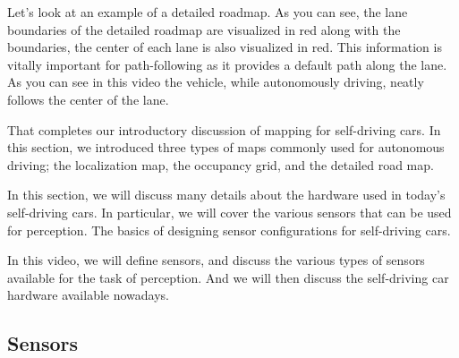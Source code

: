 Let's look at an example of a detailed roadmap. As you can see, the lane boundaries of
the detailed roadmap are visualized in red along with the boundaries, the center
of each lane is also visualized in red. This information is vitally important for path-following as it provides
a default path along the lane. As you can see in this video the vehicle, while autonomously driving,
neatly follows the center of the lane. 



That completes our introductory discussion of
mapping for self-driving cars. In this section, we introduced  three
types of maps commonly used for autonomous driving; the localization map, the
occupancy grid, and the detailed road map. 





















































In this section, we will  discuss many details about the hardware used in
today's self-driving cars. In particular, we will cover the various
sensors that can be used for perception. The basics of designing sensor
configurations for self-driving cars.

 In this video, we will define sensors, and discuss the various types of sensors
available for the task of perception. And we will then discuss the self-driving
car hardware available nowadays. 

\subsection{Sensors}
\label{sensors}

